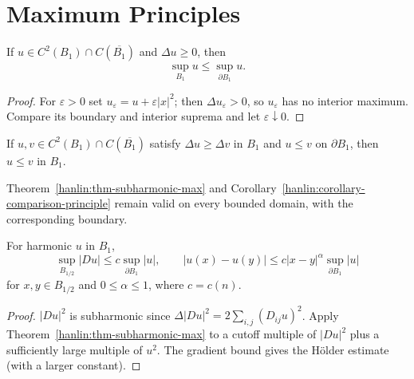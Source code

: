 \section{Maximum Principles}

\begin{theorem}\label{hanlin:thm-subharmonic-max}
If $u\in C^2(B_1)\cap C(\overline{B_1})$ and $\Delta u\ge0$, then
\[
\sup_{B_1}u\le\sup_{\partial B_1}u.
\]
\end{theorem}
\begin{proof}
\sketch For $\varepsilon>0$ set $u_\varepsilon=u+\varepsilon|x|^2$; then
$\Delta u_\varepsilon>0$, so $u_\varepsilon$ has no interior maximum. Compare
its boundary and interior suprema and let $\varepsilon\downarrow0$.
\end{proof}

\begin{corollary}\label{hanlin:corollary-comparison-principle}
If $u,v\in C^2(B_1)\cap C(\overline{B_1})$ satisfy $\Delta u\ge\Delta v$ in
$B_1$ and $u\le v$ on $\partial B_1$, then $u\le v$ in $B_1$.
\end{corollary}

\begin{remark}\label{hanlin:remark-maxprin-domain}
Theorem~\ref{hanlin:thm-subharmonic-max} and Corollary~\ref{hanlin:corollary-comparison-principle}
remain valid on every bounded domain, with the corresponding boundary.
\end{remark}

\begin{theorem}\label{hanlin:thm-interior-gradient}
For harmonic $u$ in $B_1$,
\[
\sup_{B_{1/2}}|Du|\le c\sup_{\partial B_1}|u|,
\qquad
|u(x)-u(y)|\le c|x-y|^\alpha\sup_{\partial B_1}|u|
\]
for $x,y\in B_{1/2}$ and $0\le\alpha\le1$, where $c=c(n)$.
\end{theorem}
\begin{proof}
\sketch $|Du|^2$ is subharmonic since
$\Delta|Du|^2=2\sum_{i,j}(D_{ij}u)^2$. Apply Theorem~\ref{hanlin:thm-subharmonic-max}
to a cutoff multiple of $|Du|^2$ plus a sufficiently large multiple of $u^2$.
The gradient bound gives the Hölder estimate (with a larger constant).
\end{proof}

